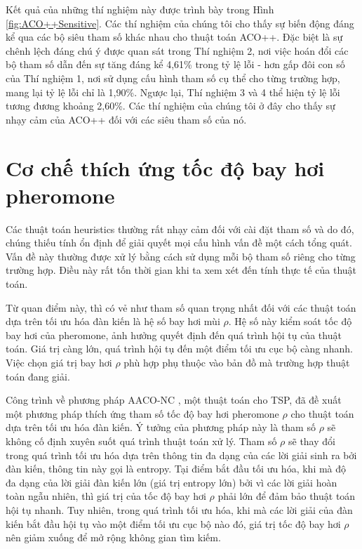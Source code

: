 Kết quả của những thí nghiệm này được trình bày trong Hình \ref{fig:ACO++Sensitive}. Các thí nghiệm của chúng tôi cho thấy sự biến động đáng kể qua các bộ siêu tham số khác nhau cho thuật toán ACO++. Đặc biệt là sự chênh lệch đáng chú ý được quan sát trong Thí nghiệm 2, nơi việc hoán đổi các bộ tham số dẫn đến sự tăng đáng kể 4,61\% trong tỷ lệ lỗi - hơn gấp đôi con số của Thí nghiệm 1, nơi sử dụng cấu hình tham số cụ thể cho từng trường hợp, mang lại tỷ lệ lỗi chỉ là 1,90\%. Ngược lại, Thí nghiệm 3 và 4 thể hiện tỷ lệ lỗi tương đương khoảng 2,60\%. Các thí nghiệm của chúng tôi ở đây cho thấy sự nhạy cảm của ACO++ đối với các siêu tham số của nó.

\section{Cơ chế thích ứng tốc độ bay hơi pheromone}\label{section:AdaptivePheromoneRate}
Các thuật toán heuristics thường rất nhạy cảm đối với cài đặt tham số và do đó, chúng thiếu tính ổn định để giải quyết mọi cấu hình vấn đề một cách tổng quát. Vấn đề này thường được xử lý bằng cách sử dụng mỗi bộ tham số riêng cho từng trường hợp. Điều này rất tốn thời gian khi ta xem xét đến tính thực tế của thuật toán.

Từ quan điểm này, thì có vẻ như tham số quan trọng nhất đối với các thuật toán dựa trên tối ưu hóa đàn kiến là hệ số bay hơi mùi $\rho$. Hệ số này kiểm soát tốc độ bay hơi của pheromone, ảnh hưởng quyết định đến quá trình hội tụ của thuật toán. Giá trị càng lớn, quá trình hội tụ đến một điểm tối ưu cục bộ càng nhanh. Việc chọn giá trị bay hơi $\rho$ phù hợp phụ thuộc vào bản đồ mà trường hợp thuật toán đang giải.

Công trình về phương pháp AACO-NC \cite{STODOLA2022101056}, một thuật toán cho TSP, đã đề xuất một phương pháp thích ứng tham số tốc độ bay hơi pheromone $\rho$ cho thuật toán dựa trên tối ưu hóa đàn kiến. Ý tưởng của phương pháp này là tham số $\rho$ sẽ không cố định xuyên suốt quá trình thuật toán xử lý. Tham số $\rho$ sẽ thay đổi trong quá trình tối ưu hóa dựa trên thông tin đa dạng của các lời giải sinh ra bởi đàn kiến, thông tin này gọi là entropy. Tại điểm bắt đầu tối ưu hóa, khi mà độ đa dạng của lời giải đàn kiến lớn (giá trị entropy lớn) bởi vì các lời giải hoàn toàn ngẫu nhiên, thì giá trị của tốc độ bay hơi $\rho$ phải lớn để đảm bảo thuật toán hội tụ nhanh. Tuy nhiên, trong quá trình tối ưu hóa, khi mà các lời giải của đàn kiến bắt đầu hội tụ vào một điểm tối ưu cục bộ nào đó, giá trị tốc độ bay hơi $\rho$ nên giảm xuống để mở rộng không gian tìm kiếm.

